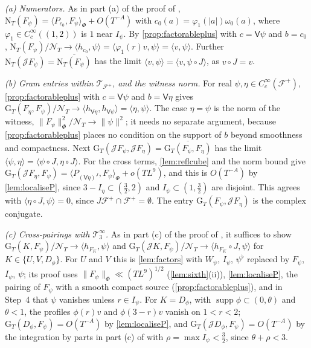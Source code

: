 \documentclass[11pt,colorlinks]{charlie}
\newcommand{\ip}[2]{\langle #1,#2\rangle}
\begin{document}
\emph{(a) Numerators.} As in part (a) of the proof of , $\mathrm N_T(F_\psi)=\ip{P_{c_0}}{F_\psi}_\Phi+O(T^{-A})$ with $c_0(a)=\varphi_1(|a|)\omega_0(a)$, where $\varphi_1\in C_c^\infty((1,2))$ is $1$ near $I_\psi$. By \cref{prop:factorableplus} with $c=\mathsf V\psi$ and $b=c_0$, $\mathrm N_T(F_\psi)/\mathcal N_T\to\ip{h_{c_0}}\psi=\ip{\varphi_1(r)v}\psi=\ip v\psi$. Further $\mathrm N_T(\mathcal JF_\psi)=\overline{\mathrm N_T(F_\psi)}$ has the limit $\ip v\psi=\ip v{\psi\circ J}$, as $v\circ J=v$.

\emph{(b) Gram entries within $\mathcal T_{\mathcal F^+}$, and the witness norm.} For real $\psi,\eta\in C_c^\infty(\mathcal F^+)$, \cref{prop:factorableplus} with $c=\mathsf V\psi$ and $b=\mathsf V\eta$ gives $\mathrm G_T(F_\eta,F_\psi)/\mathcal N_T\to\ip{h_{\mathsf V\eta}}{h_{\mathsf V\psi}}=\ip\eta\psi$. The case $\eta=\psi$ is the norm of the witness, $\|F_\psi\|_\Phi^2/\mathcal N_T\to\|\psi\|^2$; it needs no separate argument, because \cref{prop:factorableplus} places no condition on the support of $b$ beyond smoothness and compactness. Next $\mathrm G_T(\mathcal JF_\psi,\mathcal JF_\eta)=\overline{\mathrm G_T(F_\psi,F_\eta)}$ has the limit $\ip\psi\eta=\ip{\psi\circ J}{\eta\circ J}$. For the cross terms, \cref{lem:reflcube} and the norm bound give $\mathrm G_T(\mathcal JF_\eta,F_\psi)=\ip{P_{(\mathsf V\eta)^J}}{F_\psi}_\Phi+o(TL^9)$, and this is $O(T^{-A})$ by \cref{lem:localiseP}, since $3-I_\eta\subset(\frac32,2)$ and $I_\psi\subset(1,\frac32)$ are disjoint. This agrees with $\ip{\eta\circ J}\psi=0$, since $J\mathcal F^+\cap\mathcal F^+=\emptyset$. The entry $\mathrm G_T(F_\psi,\mathcal JF_\eta)$ is the complex conjugate.

\emph{(c) Cross-pairings with $\mathcal T_3^\infty$.} As in part (c) of the proof of , it suffices to show $\mathrm G_T(K,F_\psi)/\mathcal N_T\to\ip{h_{F_K}}\psi$ and $\mathrm G_T(\mathcal JK,F_\psi)/\mathcal N_T\to\ip{h_{F_K}\circ J}\psi$ for $K\in\{U,V,D_\phi\}$. For $U$ and $V$ this is \cref{lem:factors} with $W_\psi$, $I_\psi$, $\psi^\flat$ replaced by $F_\psi$, $I_\psi$, $\psi$; its proof uses $\|F_\psi\|_\Phi\ll(TL^9)^{1/2}$ (\cref{lem:sixth}(ii)), \cref{lem:localiseP}, the pairing of $F_\psi$ with a smooth compact source (\cref{prop:factorableplus}), and in Step~4 that $\psi$ vanishes unless $r\in I_\psi$. For $K=D_\phi$, with $\operatorname{supp}\phi\subset(0,\theta)$ and $\theta<1$, the profiles $\phi(r)v$ and $\phi(3-r)v$ vanish on $1<r<2$; $\mathrm G_T(D_\phi,F_\psi)=O(T^{-A})$ by \cref{lem:localiseP}, and $\mathrm G_T(\mathcal JD_\phi,F_\psi)=O(T^{-A})$ by the integration by parts in part (c) of  with $\rho=\max I_\psi<\frac32$, since $\theta+\rho<3$.
\end{document}
